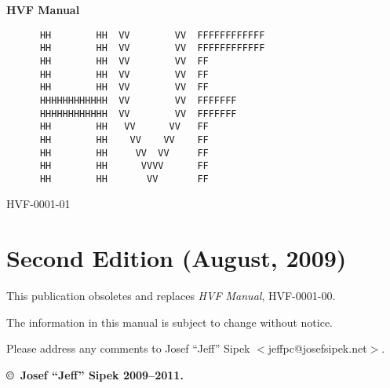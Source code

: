 \begin{titlepage}
\vspace*{0.5in}
\Huge \textbf{HVF Manual}
\normalsize
\vspace{1.4in}
\Large
\begin{verbatim}
      HH        HH  VV        VV  FFFFFFFFFFFF
      HH        HH  VV        VV  FFFFFFFFFFFF
      HH        HH  VV        VV  FF
      HH        HH  VV        VV  FF
      HH        HH  VV        VV  FF
      HHHHHHHHHHHH  VV        VV  FFFFFFF
      HHHHHHHHHHHH  VV        VV  FFFFFFF
      HH        HH   VV      VV   FF
      HH        HH    VV    VV    FF
      HH        HH     VV  VV     FF
      HH        HH      VVVV      FF
      HH        HH       VV       FF
\end{verbatim}
\normalsize
{}
\hfill HVF-0001-01
\newpage
{}
\cbstart
\section*{Second Edition (August, 2009)}
This publication obsoletes and replaces \emph{HVF Manual}, HVF-0001-00.
\cbend

\cbstart The \cbend information in this manual is subject to change without notice.

Please address any comments to Josef ``Jeff'' Sipek
$<$jeffpc@josefsipek.net$>$.

\textbf{\copyright\ Josef ``Jeff'' Sipek 2009--2011.}
\end{titlepage}
